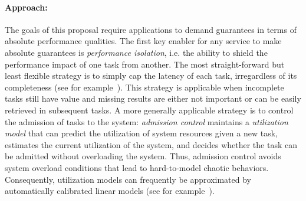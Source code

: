 
\paragraph{Approach:} The goals of this proposal require applications
to demand guarantees in terms of absolute performance qualities.
The first key enabler for any service to make absolute guarantees
is \emph{performance isolation}, i.e. the ability to shield the
performance impact of one task from another. The most straight-forward
but least flexible strategy is to simply cap the latency of each
task, irregardless of its completeness (see for
example~\cite{decandia:sosp07}). This strategy is applicable when
incomplete tasks still have value and missing results are either
not important or can be easily retrieved in subsequent tasks. A
more generally applicable strategy is to control the admission of
tasks to the system: \emph{admission control} maintains a
\emph{utilization model} that can predict the utilization of system
resources given a new task, estimates the current utilization of
the system, and decides whether the task can be admitted without
overloading the system. Thus, admission control avoids system
overload conditions that lead to hard-to-model chaotic behaviors.
Consequently, utilization models can frequently be approximated by
automatically calibrated linear models (see for
example~\cite{skourtis:hpdc12}).

